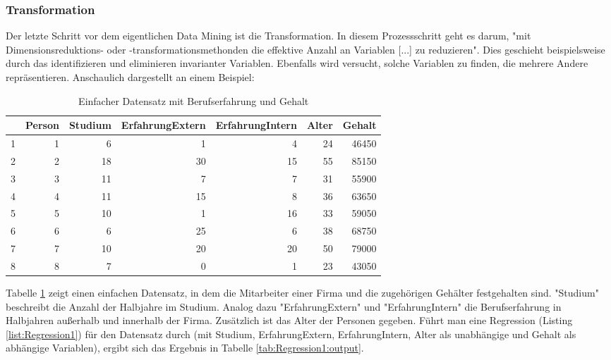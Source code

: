 \subsubsection{Transformation}
Der letzte Schritt vor dem eigentlichen Data Mining ist die Transformation. In diesem Prozessschritt geht es darum, "mit Dimensionsreduktions- oder -transformationsmethonden die effektive Anzahl an Variablen [...] zu reduzieren"\citep[S.~42; eigene Übersetzung]{fayyad_data_1996}. Dies geschieht beispielsweise durch das identifizieren und eliminieren invarianter Variablen. Ebenfalls wird versucht, solche Variablen zu finden, die mehrere Andere repräsentieren. Anschaulich dargestellt an einem Beispiel:\newline
\begin{table}[h!]
\begin{tabular}{rrrrrrr}
  \hline
 & Person & Studium & ErfahrungExtern & ErfahrungIntern & Alter & Gehalt \\ 
  \hline
1 &   1 &   6 &   1 &   4 &  24 & 46450 \\ 
  2 &   2 &  18 &  30 &  15 &  55 & 85150 \\ 
  3 &   3 &  11 &   7 &   7 &  31 & 55900 \\ 
  4 &   4 &  11 &  15 &   8 &  36 & 63650 \\ 
  5 &   5 &  10 &   1 &  16 &  33 & 59050 \\ 
  6 &   6 &   6 &  25 &   6 &  38 & 68750 \\ 
  7 &   7 &  10 &  20 &  20 &  50 & 79000 \\ 
  8 &   8 &   7 &   0 &   1 &  23 & 43050 \\ 
   \hline
\end{tabular}
\caption{Einfacher Datensatz mit Berufserfahrung und Gehalt}
\label{tab:Beispiel_Berufserfahrung_R_output_simpleData}
\end{table}
Tabelle \ref{tab:Beispiel_Berufserfahrung_R_output_simpleData} zeigt einen einfachen Datensatz, in dem die Mitarbeiter einer Firma und die zugehörigen Gehälter festgehalten sind. "Studium" beschreibt die Anzahl der Halbjahre im Studium. Analog dazu "ErfahrungExtern" und "ErfahrungIntern" die Berufserfahrung in Halbjahren außerhalb und innerhalb der Firma. Zusätzlich ist das Alter der Personen gegeben.\newline
Führt man eine Regression (Listing \ref{list:Regression1}) für den Datensatz durch (mit Studium, ErfahrungExtern, ErfahrungIntern, Alter als unabhängige und Gehalt als abhängige Variablen), ergibt sich das Ergebnis in Tabelle \ref{tab:Regression1:output}.


